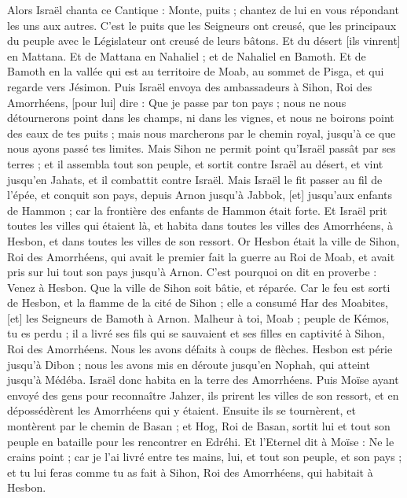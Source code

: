 \begin{multicols}{2}
Alors Israël chanta ce Cantique : Monte, puits ; chantez de lui en vous répondant les uns aux autres.
C'est le puits que les Seigneurs ont creusé, que les principaux du peuple avec le Législateur ont creusé de leurs bâtons. Et du désert [ils vinrent] en Mattana.
Et de Mattana en Nahaliel ; et de Nahaliel en Bamoth.
Et de Bamoth en la vallée qui est au territoire de Moab, au sommet de Pisga, et qui regarde vers Jésimon.
Puis Israël envoya des ambassadeurs à Sihon, Roi des Amorrhéens, [pour lui] dire :
Que je passe par ton pays ; nous ne nous détournerons point dans les champs, ni dans les vignes, et nous ne boirons point des eaux de tes puits ; mais nous marcherons par le chemin royal, jusqu'à ce que nous ayons passé tes limites.
Mais Sihon ne permit point qu'Israël passât par ses terres ; et il assembla tout son peuple, et sortit contre Israël au désert, et vint jusqu'en Jahats, et il combattit contre Israël.
Mais Israël le fit passer au fil de l'épée, et conquit son pays, depuis Arnon jusqu'à Jabbok, [et] jusqu'aux enfants de Hammon ; car la frontière des enfants de Hammon était forte.
Et Israël prit toutes les villes qui étaient là, et habita dans toutes les villes des Amorrhéens, à Hesbon, et dans toutes les villes de son ressort.
Or Hesbon était la ville de Sihon, Roi des Amorrhéens, qui avait le premier fait la guerre au Roi de Moab, et avait pris sur lui tout son pays jusqu'à Arnon.
C'est pourquoi on dit en proverbe : Venez à Hesbon. Que la ville de Sihon soit bâtie, et réparée.
Car le feu est sorti de Hesbon, et la flamme de la cité de Sihon ; elle a consumé Har des Moabites, [et] les Seigneurs de Bamoth à Arnon.
Malheur à toi, Moab ; peuple de Kémos, tu es perdu ; il a livré ses fils qui se sauvaient et ses filles en captivité à Sihon, Roi des Amorrhéens.
Nous les avons défaits à coups de flèches. Hesbon est périe jusqu'à Dibon ; nous les avons mis en déroute jusqu'en Nophah, qui atteint jusqu'à Médéba.
Israël donc habita en la terre des Amorrhéens.
Puis Moïse ayant envoyé des gens pour reconnaître Jahzer, ils prirent les villes de son ressort, et en dépossédèrent les Amorrhéens qui y étaient.
Ensuite ils se tournèrent, et montèrent par le chemin de Basan ; et Hog, Roi de Basan, sortit lui et tout son peuple en bataille pour les rencontrer en Edréhi.
Et l'Eternel dit à Moïse : Ne le crains point ; car je l'ai livré entre tes mains, lui, et tout son peuple, et son pays ; et tu lui feras comme tu as fait à Sihon, Roi des Amorrhéens, qui habitait à Hesbon.

\end{multicols}
